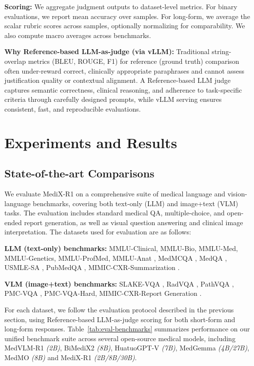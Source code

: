 \documentclass{article}
\theoremstyle{plain}
\theoremstyle{definition}
\theoremstyle{remark}
\begin{document}
\textbf{Scoring:} We aggregate judgment outputs to dataset-level metrics. For binary evaluations, we report mean accuracy over samples. For long-form, we average the scalar rubric scores across samples, optionally normalizing for comparability. We also compute macro averages across benchmarks.

\textbf{Why Reference-based LLM-as-judge  (via vLLM):} Traditional string-overlap metrics (BLEU, ROUGE, F1) for reference (ground truth)  comparison often under-reward correct, clinically appropriate paraphrases and cannot assess justification quality or contextual alignment. A Reference-based LLM judge captures semantic correctness, clinical reasoning, and adherence to task-specific criteria through carefully designed prompts, while vLLM serving ensures consistent, fast, and reproducible evaluations.

\section{Experiments and Results}
\subsection{State-of-the-art Comparisons}
We evaluate MediX-R1 on a comprehensive suite of medical language and vision-language benchmarks, covering both text-only (LLM) and image+text (VLM) tasks. The evaluation includes standard medical QA, multiple-choice, and open-ended report generation, as well as visual question answering and clinical image interpretation. The datasets used for evaluation are as follows:

\textbf{LLM (text-only) benchmarks:}
MMLU-Clinical, MMLU-Bio, MMLU-Med, MMLU-Genetics, MMLU-ProfMed, MMLU-Anat \citep{hendrycks2020measuring}, MedMCQA \citep{pal2022medmcqa}, MedQA \citep{jin2021disease}, USMLE-SA \citep{han2023medalpaca}, PubMedQA \citep{jin2019pubmedqa}, MIMIC-CXR-Summarization \citep{johnson2016mimic}.

\textbf{VLM (image+text) benchmarks:}
SLAKE-VQA \citep{liu2021slake}, RadVQA \citep{lau2018dataset}, PathVQA \citep{he2020pathvqa30000questionsmedical}, PMC-VQA \citep{zhang2024pmcvqavisualinstructiontuning}, PMC-VQA-Hard, MIMIC-CXR-Report Generation \citep{johnson2019mimic}.

For each dataset, we follow the evaluation protocol described in the previous section, using Reference-based LLM-as-judge scoring for both short-form and long-form responses. Table~\ref{tab:eval-benchmarks} summarizes performance on our unified benchmark suite across several open-source medical models, including MedVLM-R1 \textit{(2B)}, BiMediX2 \textit{(8B)}, HuatuoGPT-V \textit{(7B)}, MedGemma \textit{(4B/27B)}, MedMO \textit{(8B)} \citep{deria2026medmogroundingunderstandingmultimodal} and MediX-R1 \textit{(2B/8B/30B)}.
\end{document}
